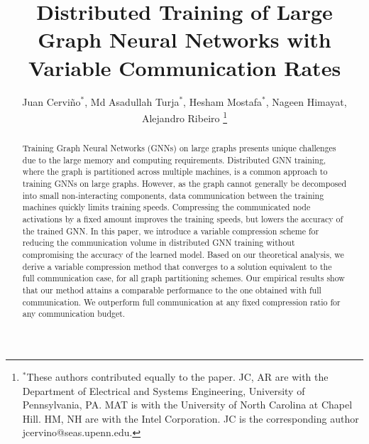 \documentclass[lettersize,journal]{IEEEtran}
\begin{document}
\title{Distributed Training of Large Graph Neural Networks with Variable Communication Rates }

\author{Juan Cervi\~no$^*$, Md Asadullah Turja$^*$, Hesham Mostafa$^*$, Nageen Himayat, Alejandro Ribeiro
\thanks{$^*$These authors contributed equally to the paper.  JC, AR are with the Department of Electrical and
Systems Engineering, University of Pennsylvania, PA. MAT is with the University of North Carolina at Chapel Hill. HM, NH are with the Intel Corporation. JC is the corresponding author jcervino@seas.upenn.edu.}%
}



\maketitle

\begin{abstract}
	Training Graph Neural Networks (GNNs) on large graphs presents unique challenges due to the large memory and computing requirements. 
	Distributed GNN training, where the graph is partitioned across multiple machines, is a common approach to training GNNs on large graphs. 
	However, as the graph cannot generally be decomposed into small non-interacting components, data communication between the training machines quickly limits training speeds. 
	Compressing the communicated node activations by a fixed amount improves the training speeds, but lowers the accuracy of the trained GNN. 
	In this paper, we introduce a variable compression scheme for reducing the communication volume in distributed GNN training without compromising the accuracy of the learned model. 
	Based on our theoretical analysis, we derive a variable compression method that converges to a solution equivalent to the full communication case, for all graph partitioning schemes. 
	Our empirical results show that our method attains a comparable performance to the one obtained with full communication. We outperform full communication at any fixed compression ratio for any communication budget.
 \end{abstract}
\end{document}
